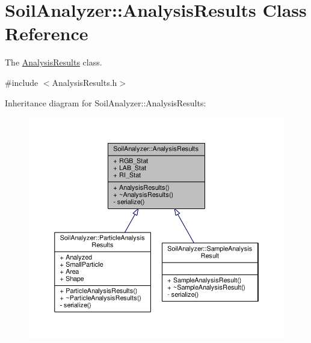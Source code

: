 \hypertarget{class_soil_analyzer_1_1_analysis_results}{}\section{Soil\+Analyzer\+:\+:Analysis\+Results Class Reference}
\label{class_soil_analyzer_1_1_analysis_results}


The \hyperlink{class_soil_analyzer_1_1_analysis_results}{Analysis\+Results} class.  




{\ttfamily \#include $<$Analysis\+Results.\+h$>$}



Inheritance diagram for Soil\+Analyzer\+:\+:Analysis\+Results\+:\nopagebreak
\begin{figure}[H]
\begin{center}
\leavevmode
\includegraphics[width=350pt]{class_soil_analyzer_1_1_analysis_results__inherit__graph}
\end{center}
\end{figure}


